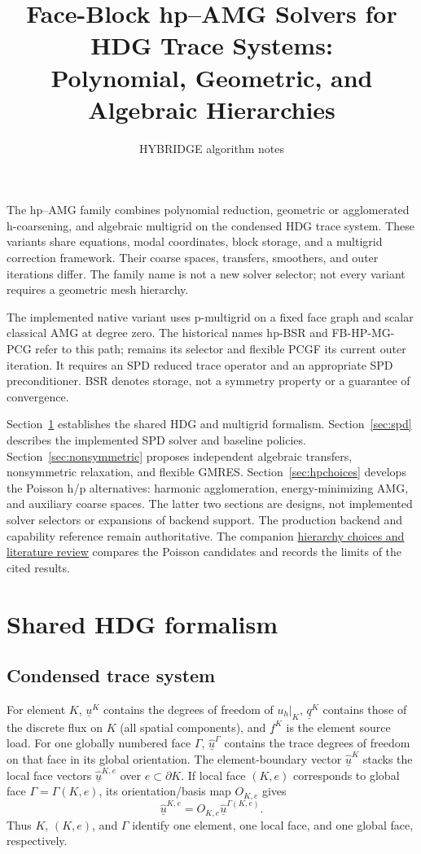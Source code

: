 \documentclass[11pt]{article}
\title{Face-Block hp--AMG Solvers for HDG Trace Systems:\\Polynomial, Geometric, and Algebraic Hierarchies}
\author{HYBRIDGE algorithm notes}
\date{}
\numberwithin{equation}{section}
\numberwithin{figure}{section}
\numberwithin{table}{section}
\newcommand{\code}[1]{\texttt{\detokenize{#1}}}
\begin{document}
\maketitle

The hp--AMG family combines polynomial reduction, geometric or agglomerated
h-coarsening, and algebraic multigrid on the condensed HDG trace system.
These variants share equations, modal coordinates, block storage, and a
multigrid correction framework. Their coarse spaces, transfers, smoothers,
and outer iterations differ. The family name is not a new solver selector;
not every variant requires a geometric mesh hierarchy.

The implemented native variant uses p-multigrid on a fixed face graph and
scalar classical AMG at degree zero. The historical names hp-BSR and
FB-HP-MG-PCG refer to this path; \code{fb-hp-mg-pcg} remains its selector
and flexible PCGF its current outer iteration. It requires an SPD reduced
trace operator and an appropriate SPD preconditioner. BSR denotes storage,
not a symmetry property or a guarantee of convergence.

Section~\ref{sec:shared} establishes the shared HDG and multigrid formalism.
Section~\ref{sec:spd} describes the implemented SPD solver and baseline policies.
Section~\ref{sec:nonsymmetric} proposes independent algebraic transfers,
nonsymmetric relaxation, and flexible GMRES.
Section~\ref{sec:hpchoices} develops the Poisson h/p alternatives: harmonic
agglomeration, energy-minimizing AMG, and auxiliary coarse spaces.
The latter two sections are designs, not implemented solver selectors or
expansions of backend support. The production backend and capability
reference remain authoritative. The companion
\href{hierarchies.md}{hierarchy choices and literature review} compares the
Poisson candidates and records the limits of the cited results.

\tableofcontents

\section{Shared HDG formalism}\label{sec:shared}
\subsection{Condensed trace system}\label{sec:condensation}
For element $K$, $\underline{u}^K$ contains the degrees of freedom of
$u_h|_K$, $\underline{q}^K$ contains those of the discrete flux on $K$
(all spatial components), and $\underline{f}^K$ is the element source load.
For one globally numbered face $\Gamma$, $\underline{\widehat{u}}^\Gamma$
contains the trace degrees of freedom on that face in its global orientation.
The element-boundary vector $\underline{\widehat{u}}^K$ stacks the local
face vectors $\underline{\widehat{u}}^{K,e}$ over $e\subset\partial K$.
If local face $(K,e)$ corresponds to global face $\Gamma=\Gamma(K,e)$,
its orientation/basis map $O_{K,e}$ gives
\[
 \underline{\widehat{u}}^{K,e}
 =O_{K,e}\underline{\widehat{u}}^{\Gamma(K,e)}.
\]
Thus $K$, $(K,e)$, and $\Gamma$ identify one element, one local face,
and one global face, respectively.
\end{document}
